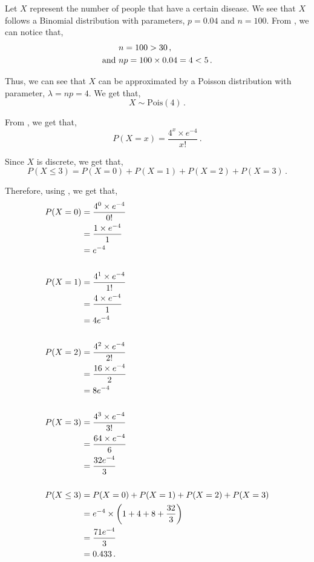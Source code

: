 \begin{subquestions}

\subquestion 

Let $X$ represent the number of people that have a certain disease. We see that $X$ follows a Binomial distribution with parameters, $p=0.04$ and $n=100$. From , we can notice that,
\begin{align}
	& n=100>30 \,, \nonumber \\
	\text{and} ~ & np=100 \times 0.04 = 4<5 \,. \nonumber 
\end{align}

Thus, we can see that $X$ can be approximated by a Poisson distribution with parameter, $\lambda=np=4$. We get that,
\begin{equation}
	X \sim \text{Pois}(4) \,.
\end{equation}

From , we get that,
\begin{equation}
	P(X = x) =\frac{4^x \times e^{-4}}{x!} \,. \label{2009:q4:PoisEqn2}
\end{equation}

Since $X$ is discrete, we get that,
\begin{equation}
	P(X \leq 3) = P(X=0)+P(X=1)+P(X=2)+P(X=3) \,.
\end{equation}

Therefore, using , we get that,
\begin{align}
	P(X=0) & = \frac{4^0 \times e^{-4}}{0!} \nonumber \\
	       & = \frac{1 \times e^{-4}}{1} \nonumber \\
	       & = e^{-4} \\ \nonumber \\
	P(X=1) & = \frac{4^1 \times e^{-4}}{1!} \nonumber \\
	       & = \frac{4 \times e^{-4}}{1} \nonumber \\
	       & = 4e^{-4} \\ \nonumber \\
	P(X=2) & = \frac{4^2 \times e^{-4}}{2!} \nonumber \\
	       & = \frac{16 \times e^{-4}}{2} \nonumber \\
	       & = 8e^{-4} \\ \nonumber \\
	P(X=3) & = \frac{4^3 \times e^{-4}}{3!} \nonumber \\
	       & = \frac{64 \times e^{-4}}{6} \nonumber \\
	       & = \frac{32e^{-4}}{3} \\ \nonumber \\
	P(X \leq 3) & = P(X=0)+P(X=1)+P(X=2)+P(X=3) \nonumber \\
	            & = e^{-4} \times \left(1+4+8+\frac{32}{3}\right) \nonumber \\
	            & = \frac{71e^{-4}}{3} \nonumber \\
	            & = 0.433 \,.
\end{align}


\end{subquestions}